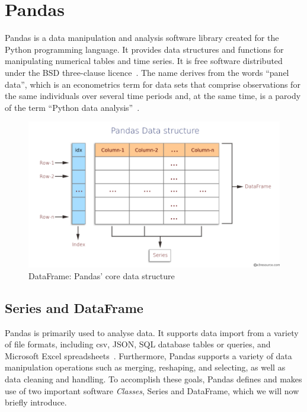 \section{Pandas}\label{section:pandas}
Pandas is a data manipulation and analysis software library created for the Python programming language. It provides data structures and functions for manipulating numerical tables and time series. It is free software distributed under the BSD three-clause licence~\cite{Misc:OpenLDAP_license:oldap-2.7}.
The name derives from the words ``panel data'', which is an econometrics term for data sets that comprise observations for the same individuals over several time periods and, at the same time, is a parody of the term ``Python data analysis''~\cite{mckinney_data_2010}.

\begin{figure}[ht]
    \centering
    \includegraphics[width=\textwidth]{content/chapter_3/images/datastructure.pdf}
    \caption{DataFrame: Pandas' core data structure}
    \label{fig:pandas_dataframe}
\end{figure}

\subsection{Series and DataFrame}
Pandas is primarily used to analyse data. It supports data import from a variety of file formats, including \ac{csv}, JSON, SQL database tables or queries, and Microsoft Excel spreadsheets~\cite{Misc:pandas_docs}.
Furthermore, Pandas supports a variety of data manipulation operations such as merging, reshaping, and selecting, as well as data cleaning and handling.
To accomplish these goals, Pandas defines and makes use of two important software \textit{Classes}, Series and DataFrame, which we will now briefly introduce.
